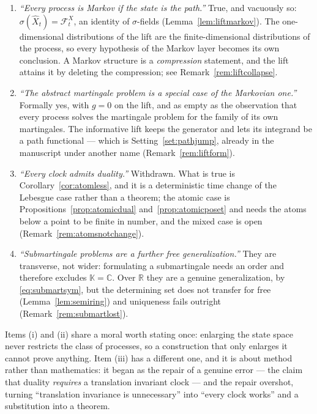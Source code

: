 \documentclass[11pt,a4paper]{article}
\theoremstyle{plain}
\theoremstyle{definition}
\theoremstyle{remark}
\newcommand{\R}{\mathbb{R}}
\newcommand{\Filt}{\mathcal{F}}
\newcommand{\K}{\mathbb{K}}
\newcommand{\C}{\mathbb{C}}
\begin{document}
\begin{enumerate}[label=(\roman*)]
\item \emph{``Every process is Markov if the state is the path.''}  True, and
  vacuously so: $\sigma(\hat{X}_t) = \Filt^X_t$, an identity of $\sigma$-fields
  (Lemma~\ref{lem:liftmarkov}).  The one-dimensional distributions of the lift
  are the finite-dimensional distributions of the process, so every hypothesis of
  the Markov layer becomes its own conclusion.  A Markov structure is a
  \emph{compression} statement, and the lift attains it by deleting the
  compression; see Remark~\ref{rem:liftcollapse}.
\item \emph{``The abstract martingale problem is a special case of the Markovian
  one.''}  Formally yes, with $g = 0$ on the lift, and as empty as the observation
  that every process solves the martingale problem for the family of its own
  martingales.  The informative lift keeps the generator and lets its integrand be
  a path functional --- which is Setting~\ref{set:pathjump}, already in the
  manuscript under another name (Remark~\ref{rem:liftform}).
\item \emph{``Every clock admits duality.''}  Withdrawn.  What is true is
  Corollary~\ref{cor:atomless}, and it is a deterministic time change of the
  Lebesgue case rather than a theorem; the atomic case is
  Propositions~\ref{prop:atomicdual} and~\ref{prop:atomicposet} and needs the
  atoms below a point to be finite in number, and the mixed case is open
  (Remark~\ref{rem:atomsnotchange}).
\item \emph{``Submartingale problems are a further free generalization.''}  They
  are transverse, not wider: formulating a submartingale needs an order and
  therefore excludes $\K = \C$.  Over $\R$ they are a genuine generalization, by
  \eqref{eq:submartsym}, but the determining set does not transfer for free
  (Lemma~\ref{lem:semiring}) and uniqueness fails outright
  (Remark~\ref{rem:submartlost}).
\end{enumerate}

\noindent
Items (i) and (ii) share a moral worth stating once: enlarging the state space
never restricts the class of processes, so a construction that only enlarges it
cannot prove anything.  Item (iii) has a different one, and it is about method
rather than mathematics: it began as the repair of a genuine error --- the claim
that duality \emph{requires} a translation invariant clock --- and the repair
overshot, turning ``translation invariance is unnecessary'' into ``every clock
works'' and a substitution into a theorem.
\end{document}
